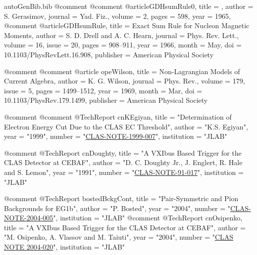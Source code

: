 \begin{filecontents*}{autoGenBib.bib}
@comment %
@comment %
@article{GDHsumRule0,
  title = {},
  author = {S. Gerasimov},
  journal = {Yad. Fiz.},
  volume = {2},
  pages = {598},
  year = {1965},
}
@comment %
@article{GDHsumRule,
  title = {Exact Sum Rule for Nucleon Magnetic Moments},
  author = {S. D. Drell and A. C. Hearn},
  journal = {Phys. Rev. Lett.},
  volume = {16},
  issue = {20},
  pages = {908--911},
  year = {1966},
  month = {May},
  doi = {10.1103/PhysRevLett.16.908},
  publisher = {American Physical Society}
}

@comment %
@comment %
@article{ opeWilson,
  title = {Non-Lagrangian Models of Current Algebra},
  author = {K. G. Wilson},
  journal = {Phys. Rev.},
  volume = {179},
  issue = {5},
  pages = {1499--1512},
  year = {1969},
  month = {Mar},
  doi = {10.1103/PhysRev.179.1499},
  publisher = {American Physical Society}
}


@comment %
@comment %
@TechReport{ cnKEgiyan,
	title = "Determination of Electron Energy Cut Due to the CLAS EC Threshold",
	author = "K.S. Egiyan",
	year = "1999",
	number = "\href{http://wwwold.jlab.org/Hall-B/notes/clas\_notes91/note91-017.pdf}{CLAS-NOTE-1999-007}",
	institution = "JLAB"
}

@comment %
@TechReport{ cnDoughty,
	title = "A VXIbus Based Trigger for the CLAS Detector at CEBAF",
	author = "{D. C. Doughty Jr., J. Englert, R. Hale and S. Lemon}",
	year = "1991",
	number = "\href{http://wwwold.jlab.org/Hall-B/notes/clas\_notes91/note91-017.pdf}{CLAS-NOTE-91-017}",
	institution = "JLAB"
}

@comment %
@TechReport{ bostedBckgCont,
	title = "Pair-Symmetric and Pion Backgrounds for EG1b",
	author = "{P. Bosted}",
	year = "2004",
	number = "\href{http://www.jlab.org/Hall-B/notes/clas\_notes04/2004-005.ps}{CLAS-NOTE-2004-005}",
	institution = "JLAB"
}
@comment %
@TechReport{ cnOsipenko,
	title = "A VXIbus Based Trigger for the CLAS Detector at CEBAF",
	author = "{M. Osipenko, A. Vlassov and M. Taiuti}",
	year = "2004",
	number = "\href{http://www.jlab.org/Hall-B/notes/clas_notes04/2004-020.pdf}{CLAS NOTE 2004-020}",
	institution = "JLAB"
}




\end{filecontents*}
